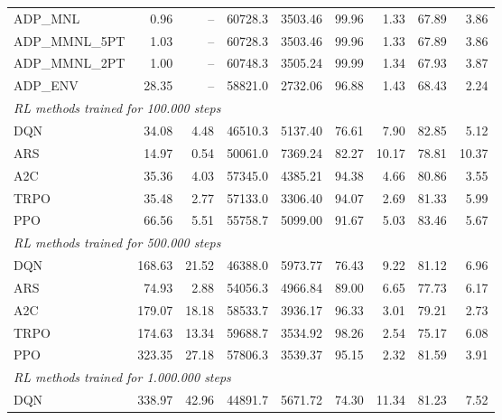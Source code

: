 \begin{samepage}
\begin{center}
\begin{tabular}{l|rr|rr|rr|rr}
    \midrule
    ADP\_MNL     &     0.96 &    -- &    60728.3 &    3503.46 &   99.96 &    1.33 &   67.89 &    3.86 \\
    ADP\_MMNL\_5PT &     1.03 &    -- &    60728.3 &    3503.46 &   99.96 &    1.33 &   67.89 &    3.86 \\
    ADP\_MMNL\_2PT &     1.00 &    -- &    60748.3 &    3505.24 &   99.99 &    1.34 &   67.93 &    3.87 \\
    ADP\_ENV     &    28.35 &    -- &    58821.0 &    2732.06 &   96.88 &    1.43 &   68.43 &    2.24 \\
    \midrule
    \multicolumn{9}{l}{\textit{RL methods trained for 100.000 steps}} \\
    \midrule
    DQN          &    34.08 &     4.48 &    46510.3 &    5137.40 &   76.61 &    7.90 &   82.85 &    5.12 \\
    ARS          &    14.97 &     0.54 &    50061.0 &    7369.24 &   82.27 &   10.17 &   78.81 &   10.37 \\
    A2C          &    35.36 &     4.03 &    57345.0 &    4385.21 &   94.38 &    4.66 &   80.86 &    3.55 \\
    TRPO         &    35.48 &     2.77 &    57133.0 &    3306.40 &   94.07 &    2.69 &   81.33 &    5.99 \\
    PPO          &    66.56 &     5.51 &    55758.7 &    5099.00 &   91.67 &    5.03 &   83.46 &    5.67 \\
    \midrule
    \multicolumn{9}{l}{\textit{RL methods trained for 500.000 steps}} \\
    \midrule
    DQN          &   168.63 &    21.52 &    46388.0 &    5973.77 &   76.43 &    9.22 &   81.12 &    6.96 \\
    ARS          &    74.93 &     2.88 &    54056.3 &    4966.84 &   89.00 &    6.65 &   77.73 &    6.17 \\
    A2C          &   179.07 &    18.18 &    58533.7 &    3936.17 &   96.33 &    3.01 &   79.21 &    2.73 \\
    TRPO         &   174.63 &    13.34 &    59688.7 &    3534.92 &   98.26 &    2.54 &   75.17 &    6.08 \\
    PPO          &   323.35 &    27.18 &    57806.3 &    3539.37 &   95.15 &    2.32 &   81.59 &    3.91 \\
    \midrule
    \multicolumn{9}{l}{\textit{RL methods trained for 1.000.000 steps}} \\
    \midrule
    DQN          &   338.97 &    42.96 &    44891.7 &    5671.72 &   74.30 &   11.34 &   81.23 &    7.52 \\

\end{tabular}
\end{center}
\end{samepage}
